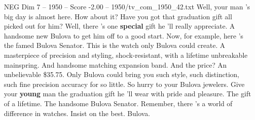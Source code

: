 \begin{textsample}{NEG Dim 7 – 1950 – Score -2.00 – 1950/tv\_com\_1950\_42.txt}  \label{ex:f7_neg_081}
Well, your man 's big day is almost here.
How about it?
Have you got that graduation gift all picked out for him?
Well, there 's one \textbf{special} gift he 'll really appreciate.
A handsome new Bulova to get him off to a good start.
Now, for example, here 's the famed Bulova Senator.
This is the watch only Bulova could create.
A masterpiece of precision and styling, shock-resistant, with a lifetime unbreakable mainspring.
And handsome matching expansion band.
And the price?
An unbelievable \$35.75.
Only Bulova could bring you such style, such distinction, such fine precision accuracy for so little.
So hurry to your Bulova jewelers.
Give your \textbf{young} man the graduation gift he 'll wear with pride and pleasure.
The gift of a lifetime.
The handsome Bulova Senator.
Remember, there 's a world of difference in watches.
Insist on the best.
Bulova.

\end{textsample}
